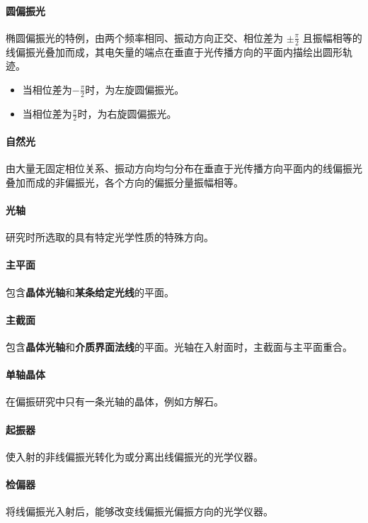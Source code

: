\documentclass{article}
\begin{document}
	\paragraph{圆偏振光}
	椭圆偏振光的特例，由两个频率相同、振动方向正交、相位差为 \(\pm\frac{\pi}{2}\) 且振幅相等的线偏振光叠加而成，其电矢量的端点在垂直于光传播方向的平面内描绘出圆形轨迹。
	
	\begin{itemize}[leftmargin=2em]
		\item 当相位差为\(-\frac{\pi}{2}\)时，为左旋圆偏振光。 
		
		\item 当相位差为\(\frac{\pi}{2}\)时，为右旋圆偏振光。
	
	\end{itemize}
	
	
	\paragraph{自然光}
	由大量无固定相位关系、振动方向均匀分布在垂直于光传播方向平面内的线偏振光叠加而成的非偏振光，各个方向的偏振分量振幅相等。
	
	\paragraph{光轴}
	研究时所选取的具有特定光学性质的特殊方向。
	
	\paragraph{主平面}包含\textbf{晶体光轴}和\textbf{某条给定光线}的平面。
	
	\paragraph{主截面}包含\textbf{晶体光轴}和\textbf{介质界面法线}的平面。光轴在入射面时，主截面与主平面重合。

	\paragraph{单轴晶体}
	在偏振研究中只有一条光轴的晶体，例如方解石。
	
	\paragraph{起振器}
	使入射的非线偏振光转化为或分离出线偏振光的光学仪器。
	
	\paragraph{检偏器}
	将线偏振光入射后，能够改变线偏振光偏振方向的光学仪器。
	
\end{document}
